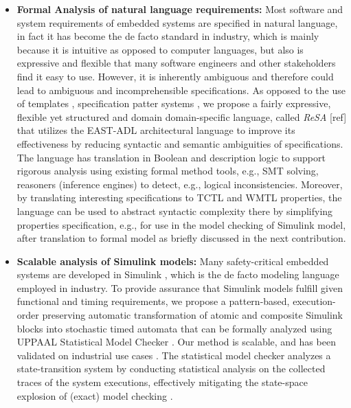 \begin{itemize}
    \item \textbf{Formal Analysis of natural language requirements: } Most software and system requirements \cite{ieereqspecstandard} of embedded systems are specified in natural language, in fact it has become the de facto standard in industry, which is mainly because it is intuitive as opposed to computer languages, but also is expressive and flexible that many software engineers and other stakeholders find it easy to use. However, it is inherently ambiguous and therefore could lead to ambiguous and incomprehensible specifications. 
    As opposed to the use of templates \cite{Hull2011RequirementsEngineering}, specification patter systems\cite{Gruhn2006PatternsSpecifications,Konrad2005Real-timePatterns} , we propose a fairly expressive, flexible yet structured and domain domain-specific language, called \textit{ReSA} [ref] that utilizes the EAST-ADL architectural language to improve its effectiveness by reducing syntactic and semantic ambiguities of specifications. The language has translation in Boolean and description logic to support rigorous analysis using existing formal method tools, e.g., SMT solving, reasoners (inference engines) to detect, e.g., logical inconsistencies. Moreover, by translating interesting specifications to TCTL and WMTL properties, the language can be used to abstract syntactic complexity there by simplifying properties specification, e.g., for use in the model checking of Simulink model, after translation to formal model as briefly discussed  in the next contribution.
    \item \textbf{Scalable analysis of Simulink models: }
    Many safety-critical embedded systems are developed in Simulink \cite{JamesB.Dabney2003MasteringSimulink}, which is the de facto modeling language employed in industry.  To provide assurance that Simulink models fulfill given functional and timing requirements, we propose a pattern-based, execution-order preserving automatic transformation of atomic and composite Simulink blocks into stochastic timed automata that can be formally analyzed using UPPAAL Statistical Model Checker \cite{Bulychev2012UPPAAL-SMC:Automata}. Our method is scalable, and has been validated on industrial use cases \cite{Filipovikj2016SimulinkSystems}. The statistical model checker analyzes a state-transition system by conducting statistical analysis on the collected traces of the system executions, effectively mitigating the state-space explosion of (exact) model checking \cite{Legay2010StatisticalOverview}. 


\end{itemize}
